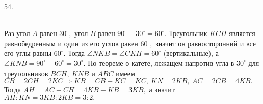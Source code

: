 54. \begin{figure}[ht!]
\end{figure}\\
Раз угол $A$ равен $30^\circ,$ угол $B$ равен $90^\circ-30^\circ=60^\circ.$ Треугольник $KCH$ является равнобедренным и один из его углов равен $60^\circ,$ значит он равносторонний и все его углы равны $60^\circ.$ Тогда $\angle NKB=\angle CKH=60^\circ$ (вертикальные), а $\angle KNB=90^\circ-60^\circ=30^\circ.$ По теореме о катете, лежащем напротив угла в $30^\circ$ для треугольников $BCH,\ KNB$ и $ABC$ имеем $CB=2CH=2KC\Rightarrow KB=CB-KC=KC,\ KN=2KB,\ AC=2CB=4KB.$ Тогда $AH=AC-CH=4KB-KB=3KB,$ а значит $AH:KN=3KB:2KB=3:2.$\\
